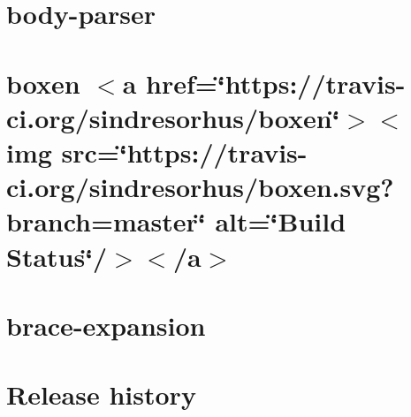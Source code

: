 \let\mypdfximage\pdfximage\def\pdfximage{\immediate\mypdfximage}\documentclass[twoside]{book}
\newcommand{\+}{\discretionary{\mbox{\scriptsize$\hookleftarrow$}}{}{}}
\begin{document}
\chapter{body-\/parser}
\label{md__c_1__git_hub__p_r_o_y_e_c_t_o-_i_i_i-_g_o_t_rest-api_node_modules_body-parser__r_e_a_d_m_e}

\chapter{boxen $<$a href=\char`\"{}https\+://travis-\/ci.\+org/sindresorhus/boxen\char`\"{}$>$$<$img src=\char`\"{}https\+://travis-\/ci.\+org/sindresorhus/boxen.\+svg?branch=master\char`\"{} alt=\char`\"{}\+Build Status\char`\"{}/$>$$<$/a$>$}
\label{md__c_1__git_hub__p_r_o_y_e_c_t_o-_i_i_i-_g_o_t_rest-api_node_modules_boxen_readme}

\chapter{brace-\/expansion}
\label{md__c_1__git_hub__p_r_o_y_e_c_t_o-_i_i_i-_g_o_t_rest-api_node_modules_brace-expansion__r_e_a_d_m_e}

\chapter{Release history}
\label{md__c_1__git_hub__p_r_o_y_e_c_t_o-_i_i_i-_g_o_t_rest-api_node_modules_braces__c_h_a_n_g_e_l_o_g}

\end{document}
